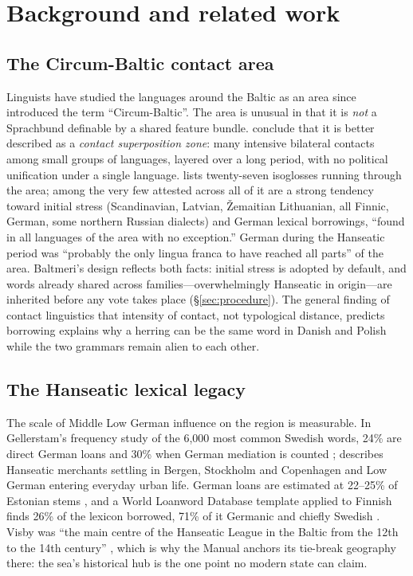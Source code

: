 \section{Background and related work}\label{sec:related}

\subsection{The Circum-Baltic contact area}\label{sec:related-cb}
Linguists have studied the languages around the Baltic as an area since \citet{dahl2001} introduced the term ``Circum-Baltic''. The area is unusual in that it is \emph{not} a Sprachbund definable by a shared feature bundle. \citet{koptjevskaja2001} conclude that it is better described as a \emph{contact superposition zone}: many intensive bilateral contacts among small groups of languages, layered over a long period, with no political unification under a single language. \citet{serzant2025} lists twenty-seven isoglosses running through the area; among the very few attested across all of it are a strong tendency toward initial stress (Scandinavian, Latvian, Žemaitian Lithuanian, all Finnic, German, some northern Russian dialects) and German lexical borrowings, ``found in all languages of the area with no exception.'' German during the Hanseatic period was ``probably the only lingua franca to have reached all parts'' of the area. Baltmeri's design reflects both facts: initial stress is adopted by default, and words already shared across families---overwhelmingly Hanseatic in origin---are inherited before any vote takes place (\S\ref{sec:procedure}). The general finding of contact linguistics that intensity of contact, not typological distance, predicts borrowing \citep{thomason1988} explains why a herring can be the same word in Danish and Polish while the two grammars remain alien to each other.

\subsection{The Hanseatic lexical legacy}\label{sec:related-hansa}
The scale of Middle Low German influence on the region is measurable. In Gellerstam's frequency study of the 6,000 most common Swedish words, 24\% are direct German loans and 30\% when German mediation is counted \citep{gellerstam1973,elmevik2012}; \citet{jahr1999} describes Hanseatic merchants settling in Bergen, Stockholm and Copenhagen and Low German entering everyday urban life. German loans are estimated at 22--25\% of Estonian stems \citep{hinderling1981}, and a World Loanword Database template applied to Finnish finds 26\% of the lexicon borrowed, 71\% of it Germanic and chiefly Swedish \citep{cronhamn2018}. Visby was ``the main centre of the Hanseatic League in the Baltic from the 12th to the 14th century'' \citep{unesco1995,dollinger1970}, which is why the Manual anchors its tie-break geography there: the sea's historical hub is the one point no modern state can claim.

